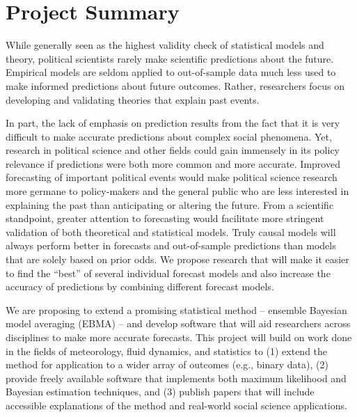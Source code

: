 \documentclass[pdftex,12pt,fullpage,oneside]{amsart}
\begin{document}
\section*{Project Summary}

While generally seen as the highest validity check of statistical
models and theory, political scientists rarely make scientific
predictions about the future.  Empirical models are seldom applied to %
out-of-sample data much less used to make informed predictions about
future outcomes.  Rather, researchers focus on developing and
validating theories that explain past events.

In part, the lack of emphasis on prediction results from the fact that
it is very difficult to make accurate predictions about complex social
phenomena. Yet, research in political science and other fields could
gain immensely in its policy relevance if predictions were both more common
and more accurate.  Improved forecasting of important political events
would make political science research more germane to policy-makers
and the general public who are less interested in explaining the past
than anticipating or altering the future.  From a scientific
standpoint, greater attention to forecasting would facilitate more
stringent validation of both theoretical and statistical models. Truly causal models will always perform better in forecasts and out-of-sample predictions than models that are solely based on prior odds. We propose research that will make it easier to find the ``best'' of several individual forecast models and also increase the accuracy of predictions by combining different forecast models. 

We are proposing to extend a promising statistical method -- ensemble Bayesian model averaging
(EBMA) -- and develop software that will aid researchers across
disciplines to make more accurate forecasts.  This project will build
on work done in the fields of meteorology, fluid dynamics, and
statistics to (1) extend the method for application to a wider array
of outcomes (e.g., binary data), (2) provide freely available software
that implements both maximum likelihood and Bayesian estimation
techniques, and (3) publish papers that will include accessible
explanations of the method and real-world social science applications.
\end{document}
